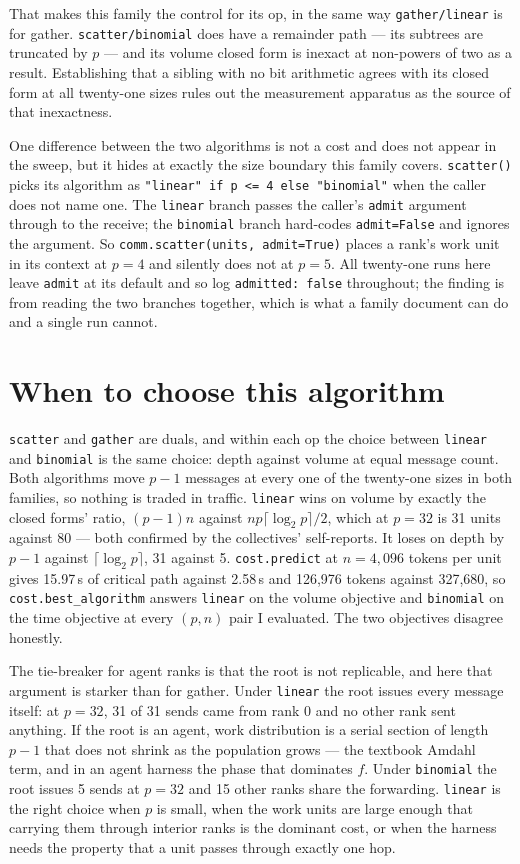 \documentclass[11pt]{article}
\begin{document}
That makes this family the control for its op, in the same way \texttt{gather/linear} is for
gather. \texttt{scatter/binomial} does have a remainder path --- its subtrees are truncated by $p$
--- and its volume closed form is inexact at non-powers of two as a result. Establishing that a
sibling with no bit arithmetic agrees with its closed form at all twenty-one sizes rules out the
measurement apparatus as the source of that inexactness.

One difference between the two algorithms is not a cost and does not appear in the sweep, but it
hides at exactly the size boundary this family covers. \texttt{scatter()} picks its algorithm as
\texttt{"linear" if p <= 4 else "binomial"} when the caller does not name one. The
\texttt{linear} branch passes the caller's \texttt{admit} argument through to the receive; the
\texttt{binomial} branch hard-codes \texttt{admit=False} and ignores the argument. So
\texttt{comm.scatter(units, admit=True)} places a rank's work unit in its context at $p=4$ and
silently does not at $p=5$. All twenty-one runs here leave \texttt{admit} at its default and so
log \texttt{admitted: false} throughout; the finding is from reading the two branches together,
which is what a family document can do and a single run cannot.

\section{When to choose this algorithm}

\texttt{scatter} and \texttt{gather} are duals, and within each op the choice between
\texttt{linear} and \texttt{binomial} is the same choice: depth against volume at equal message
count. Both algorithms move $p-1$ messages at every one of the twenty-one sizes in both families,
so nothing is traded in traffic. \texttt{linear} wins on volume by exactly the closed forms'
ratio, $(p-1)n$ against $np\lceil\log_2 p\rceil/2$, which at $p=32$ is 31 units against 80 --- both
confirmed by the collectives' self-reports. It loses on depth by $p-1$ against
$\lceil\log_2 p\rceil$, 31 against 5. \texttt{cost.predict} at $n = 4{,}096$ tokens per unit gives
15.97\,s of critical path against 2.58\,s and 126,976 tokens against 327,680, so
\texttt{cost.best\_algorithm} answers \texttt{linear} on the volume objective and
\texttt{binomial} on the time objective at every $(p, n)$ pair I evaluated. The two objectives
disagree honestly.

The tie-breaker for agent ranks is that the root is not replicable, and here that argument is
starker than for gather. Under \texttt{linear} the root issues every message itself: at $p=32$,
31 of 31 sends came from rank 0 and no other rank sent anything. If the root is an agent, work
distribution is a serial section of length $p-1$ that does not shrink as the population grows ---
the textbook Amdahl term, and in an agent harness the phase that dominates $f$. Under
\texttt{binomial} the root issues 5 sends at $p=32$ and 15 other ranks share the forwarding.
\texttt{linear} is the right choice when $p$ is small, when the work units are large enough that
carrying them through interior ranks is the dominant cost, or when the harness needs the property
that a unit passes through exactly one hop.
\end{document}
